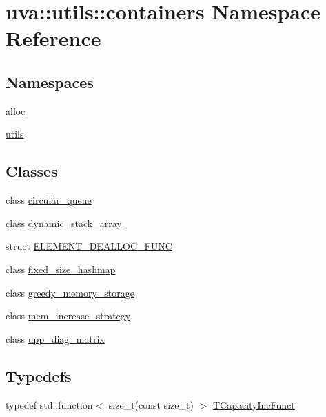 \hypertarget{namespaceuva_1_1utils_1_1containers}{}\section{uva\+:\+:utils\+:\+:containers Namespace Reference}
\label{namespaceuva_1_1utils_1_1containers}
\subsection*{Namespaces}
\begin{DoxyCompactItemize}
\item 
 \hyperlink{namespaceuva_1_1utils_1_1containers_1_1alloc}{alloc}
\item 
 \hyperlink{namespaceuva_1_1utils_1_1containers_1_1utils}{utils}
\end{DoxyCompactItemize}
\subsection*{Classes}
\begin{DoxyCompactItemize}
\item 
class \hyperlink{classuva_1_1utils_1_1containers_1_1circular__queue}{circular\+\_\+queue}
\item 
class \hyperlink{classuva_1_1utils_1_1containers_1_1dynamic__stack__array}{dynamic\+\_\+stack\+\_\+array}
\item 
struct \hyperlink{structuva_1_1utils_1_1containers_1_1_e_l_e_m_e_n_t___d_e_a_l_l_o_c___f_u_n_c}{E\+L\+E\+M\+E\+N\+T\+\_\+\+D\+E\+A\+L\+L\+O\+C\+\_\+\+F\+U\+N\+C}
\item 
class \hyperlink{classuva_1_1utils_1_1containers_1_1fixed__size__hashmap}{fixed\+\_\+size\+\_\+hashmap}
\item 
class \hyperlink{classuva_1_1utils_1_1containers_1_1greedy__memory__storage}{greedy\+\_\+memory\+\_\+storage}
\item 
class \hyperlink{classuva_1_1utils_1_1containers_1_1mem__increase__strategy}{mem\+\_\+increase\+\_\+strategy}
\item 
class \hyperlink{classuva_1_1utils_1_1containers_1_1upp__diag__matrix}{upp\+\_\+diag\+\_\+matrix}
\end{DoxyCompactItemize}
\subsection*{Typedefs}
\begin{DoxyCompactItemize}
\item 
typedef std\+::function$<$ size\+\_\+t(const size\+\_\+t) $>$ \hyperlink{namespaceuva_1_1utils_1_1containers_ab6acd1b6093503e17f6d8b942e9fccf1}{T\+Capacity\+Inc\+Funct}
\end{DoxyCompactItemize}

